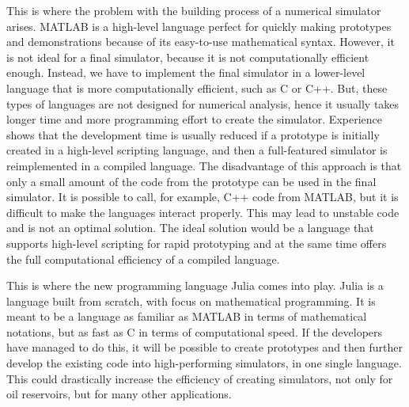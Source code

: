 This is where the problem with the building process of a numerical simulator arises. MATLAB is a high-level language perfect for quickly making prototypes and demonstrations because of its easy-to-use mathematical syntax. However, it is not ideal for a final simulator, because it is not computationally efficient enough. Instead, we have to implement the final simulator in a lower-level language that is more computationally efficient, such as C or C++. But, these types of languages are not designed for numerical analysis, hence it usually takes longer time and more programming effort to create the simulator. Experience shows that the development time is usually reduced if a prototype is initially created in a high-level scripting language, and then a full-featured simulator is reimplemented in a compiled language. The disadvantage of this approach is that only a small amount of the code from the prototype can be used in the final simulator. It is possible to call, for example, C++ code from MATLAB, but it is difficult to make the languages interact properly. This may lead to unstable code and is not an optimal solution. The ideal solution would be a language that supports high-level scripting for rapid prototyping and at the same time offers the full computational efficiency of a compiled language.

This is where the new programming language Julia comes into play. Julia is a language built from scratch, with focus on mathematical programming. It is meant to be a language as familiar as MATLAB in terms of mathematical notations, but as fast as C in terms of computational speed. If the developers have managed to do this, it will be possible to create prototypes and then further develop the existing code into high-performing simulators, in one single language. This could drastically increase the efficiency of creating simulators, not only for oil reservoirs, but for many other applications. 

